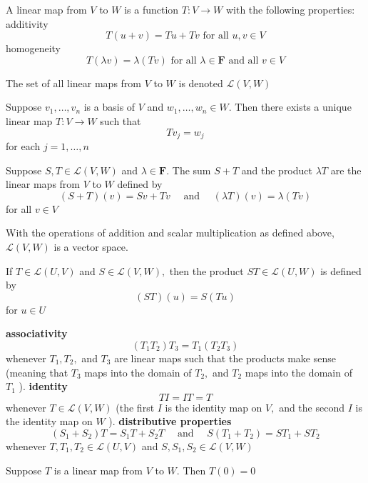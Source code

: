 
A linear map from $V$ to $W$ is a function $T: V \rightarrow W$ with the following properties:
additivity
$$
T(u+v)=T u+T v \text { for all } u, v \in V
$$
homogeneity
$$
T(\lambda v)=\lambda(T v) \text { for all } \lambda \in \mathbf{F} \text { and all } v \in V
$$

The set of all linear maps from $V$ to $W$ is denoted $\mathcal{L}(V, W)$

Suppose $v_{1}, \ldots, v_{n}$ is a basis of $V$ and $w_{1}, \ldots, w_{n} \in W .$ Then there exists a unique linear map $T: V \rightarrow W$ such that
$$
T v_{j}=w_{j}
$$
for each $j=1, \ldots, n$

Suppose $S, T \in \mathcal{L}(V, W)$ and $\lambda \in \mathbf{F} .$ The sum $S+T$ and the product $\lambda T$ are the linear maps from $V$ to $W$ defined by
$$
(S+T)(v)=S v+T v \quad \text { and } \quad(\lambda T)(v)=\lambda(T v)
$$
for all $v \in V$

With the operations of addition and scalar multiplication as defined above, $\mathcal{L}(V, W)$ is a vector space.

If $T \in \mathcal{L}(U, V)$ and $S \in \mathcal{L}(V, W),$ then the product $S T \in \mathcal{L}(U, W)$ is defined by
$$
(S T)(u)=S(T u)
$$
for $u \in U$

\textbf{associativity}
$$
\left(T_{1} T_{2}\right) T_{3}=T_{1}\left(T_{2} T_{3}\right)
$$
whenever $T_{1}, T_{2},$ and $T_{3}$ are linear maps such that the products make sense (meaning that $T_{3}$ maps into the domain of $T_{2},$ and $T_{2}$ maps into the domain of $T_{1}$ ).
\textbf{identity}
$$
T I=I T=T
$$
whenever $T \in \mathcal{L}(V, W)$ (the first $I$ is the identity map on $V,$ and the second $I$ is the identity map on $W$ ).
\textbf{distributive properties}
$$
\left(S_{1}+S_{2}\right) T=S_{1} T+S_{2} T \quad \text { and } \quad S\left(T_{1}+T_{2}\right)=S T_{1}+S T_{2}
$$
whenever $T, T_{1}, T_{2} \in \mathcal{L}(U, V)$ and $S, S_{1}, S_{2} \in \mathcal{L}(V, W)$

Suppose $T$ is a linear map from $V$ to $W .$ Then $T(0)=0$
